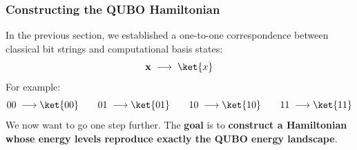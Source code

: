 \subsubsection{Constructing the QUBO Hamiltonian}\label{sec:constructing-the-qubo-hamiltonian}

In the previous section, we established a one-to-one correspondence between classical bit strings and computational basis states:
\begin{equation*}
    \mathbf{x} \; \longrightarrow \; \ket{x}
\end{equation*}
For example:
\begin{equation*}
    00 \; \longrightarrow \ket{00} \qquad 01 \; \longrightarrow \ket{01} \qquad 10 \; \longrightarrow \ket{10} \qquad 11 \; \longrightarrow \ket{11}
\end{equation*}
We now want to go one step further. The \textbf{goal} is to \textbf{construct a Hamiltonian whose energy levels reproduce exactly the QUBO energy landscape}.

